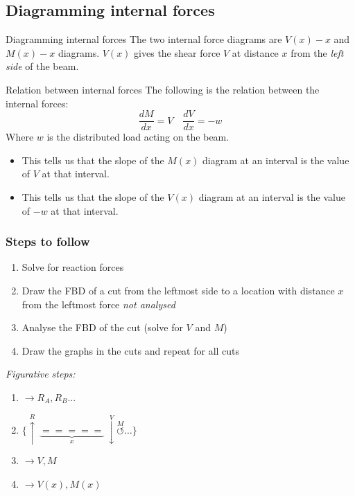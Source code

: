 \subsection{Diagramming internal forces}
\begin{definition}
    {Diagramming internal forces}
    The two internal force diagrams are $V(x)-x$ and $M(x)-x$ diagrams. $V(x)$ gives the shear force $V$ at distance $x$ from the \emph{left side} of the beam.
\end{definition}
\begin{theorem}
    {Relation between internal forces}
    The following is the relation between the internal forces:
    \[\frac{dM}{dx}=V\quad \frac{dV}{dx}=-w\]
    Where $w$ is the distributed load acting on the beam.
    \begin{itemize}
        \item This tells us that the slope of the $M(x)$ diagram at an interval is the value of $V$ at that interval.
        \item This tells us that the slope of the $V(x)$ diagram at an interval is the value of $-w$ at that interval.
    \end{itemize}
\end{theorem}

\subsubsection{Steps to follow}
\begin{minipage}{0.6\textwidth}
    \begin{enumerate}
        \item Solve for reaction forces
        \item Draw the FBD of a cut from the leftmost side to a location with distance $x$ from the leftmost force \emph{not analysed}
        \item Analyse the FBD of the cut (solve for $V$ and $M$)
        \item Draw the graphs in the cuts and repeat for all cuts
    \end{enumerate}
\end{minipage}
\hfill
\begin{minipage}{0.35\textwidth}
    \emph{Figurative steps:}
    \begin{enumerate}
        \item $\to R_A, R_B...$
        \item $\{\overset{R}{\uparrow}\ \underbrace{=====}_x\ \overset{V}{\downarrow}\overset{M}{\circlearrowleft}\dots\}$
        \item $\to V, M$
        \item $\to V(x), M(x)$
    \end{enumerate}
\end{minipage}

